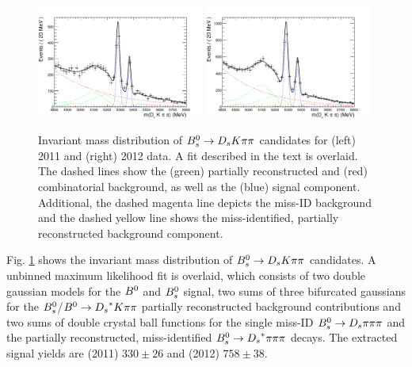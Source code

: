 \begin{figure}[h]
\includegraphics[height=7.cm,width=0.49\textwidth]{figs/BmassFit_11.pdf}
\includegraphics[height=7.cm,width=0.49\textwidth]{figs/BmassFit_12.pdf}
\caption{Invariant mass distribution of ${{B}^0_{s}}\rightarrow{\ensuremath{{D}_{s}}}{\ensuremath{K}}{\ensuremath{\pi}}{\ensuremath{\pi}}$ candidates for (left) 2011 and (right) 2012 data.
A fit described in the text is overlaid. The dashed lines show the (green) partially reconstructed and (red) combinatorial background, as well as the (blue) signal component. 
Additional, the dashed magenta line depicts the miss-ID background and the dashed yellow line shows the miss-identified, partially reconstructed background component.}
\label{fig: BsDsKpipiFit}
\end{figure}


Fig. \ref{fig: BsDsKpipiFit} shows the invariant mass distribution of ${{B}^0_{s}}\rightarrow{\ensuremath{{D}_{s}}}{\ensuremath{K}}{\ensuremath{\pi}}{\ensuremath{\pi}}$ candidates. 
A unbinned maximum likelihood fit is overlaid, which consists of two double gaussian models for the ${{B}^0}$ and ${{B}^0_{s}}$ signal, two sums of three bifurcated gaussians for the ${{B}^0_{s}}$/${{B}^0}\rightarrow{\ensuremath{{D}_{s}}}^{*}{K}{\pi}{\pi}$ partially reconstructed background contributions and two sums of double crystal ball functions for the single miss-ID ${{B}^0_{s}}\rightarrow{\ensuremath{{D}_{s}}}{\ensuremath{\pi}}{\ensuremath{\pi}}{\ensuremath{\pi}}$ and the partially reconstructed, miss-identified ${{B}^0_{s}}\rightarrow{\ensuremath{{D}_{s}}}^{*}{\pi}{\pi}{\pi}$ decays. \newline
The extracted signal yields are (2011) $330 \pm  26$ and (2012) $758 \pm 38$.  


